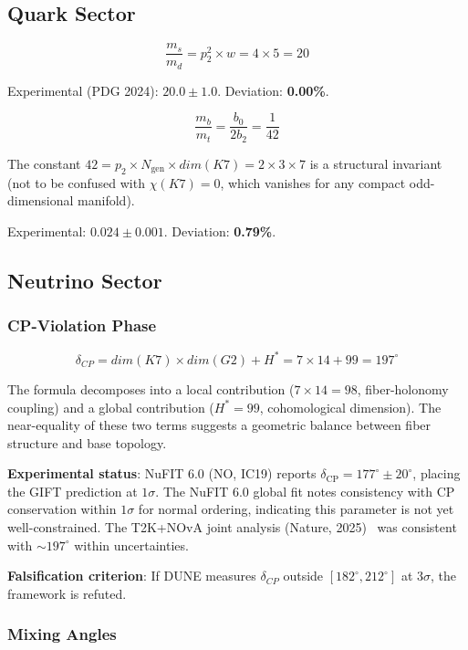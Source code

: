\documentclass[11pt,a4paper]{article}
\newcommand{\Gtwo}{\mathrm{G}_2}
\newcommand{\Kseven}{K_7}
\newcommand{\dimE}{\mathrm{dim}}
\newcommand{\Weyl}{w}
\newcommand{\CP}{\mathrm{CP}}
\def\CP{CP}%
\def\Gtwo{G2}%
\def\Kseven{K7}%
\def\dimE{dim}%
\def\Weyl{w}%
\begin{document}
\subsection{Quark Sector}

$$\frac{m_s}{m_d} = p_2^2 \times \Weyl = 4 \times 5 = 20$$

Experimental (PDG 2024): $20.0 \pm 1.0$. Deviation: \textbf{0.00\%}.

$$\frac{m_b}{m_t} = \frac{b_0}{2b_2} = \frac{1}{42}$$

The constant $42 = p_2 \times N_{\mathrm{gen}} \times \dimE(\Kseven) = 2 \times 3 \times 7$ is a structural invariant (not to be confused with $\chi(\Kseven) = 0$, which vanishes for any compact odd-dimensional manifold).

Experimental: $0.024 \pm 0.001$. Deviation: \textbf{0.79\%}.

\subsection{Neutrino Sector}

\subsubsection{CP-Violation Phase}

$$\delta_{\CP} = \dimE(\Kseven) \times \dimE(\Gtwo) + H^* = 7 \times 14 + 99 = 197^\circ$$

The formula decomposes into a local contribution ($7 \times 14 = 98$, fiber-holonomy coupling) and a global contribution ($H^* = 99$, cohomological dimension). The near-equality of these two terms suggests a geometric balance between fiber structure and base topology.

\textbf{Experimental status}: NuFIT 6.0 (NO, IC19) reports $\delta_{\mathrm{CP}} = 177^\circ \pm 20^\circ$, placing the GIFT prediction at $1\sigma$. The NuFIT 6.0 global fit notes consistency with CP conservation within $1\sigma$ for normal ordering, indicating this parameter is not yet well-constrained. The T2K+NOvA joint analysis (Nature, 2025)~\cite{t2knova2025} was consistent with ${\sim}197^\circ$ within uncertainties.

\textbf{Falsification criterion}: If DUNE measures $\delta_{\CP}$ outside $[182^\circ, 212^\circ]$ at $3\sigma$, the framework is refuted.

\subsubsection{Mixing Angles}
\end{document}
